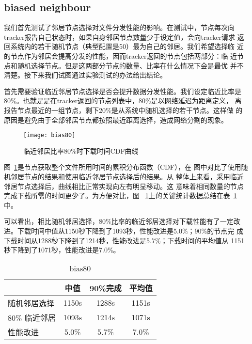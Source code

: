 \subsection{biased neighbour}


我们首先测试了邻居节点选择对文件分发性能的影响。在测试中，节点每次向
tracker报告自己状态时，如果自身邻居节点数量少于设定值，会向tracker请求
返回系统内的若干随机节点（典型配置是50）最为自己的邻居。我们希望选择临
近的节点作为邻居会提高分发的性能，因而tracker返回的节点包括两部分：临
近节点和随机选择节点。但是这两部分节点的数量、比率在什么情况下会是最优
并不清楚。接下来我们试图通过实验测试的办法给出结论。

首先需要验证临近邻居节点选择是否会提升数据分发性能。我们设定临近比率是
80\%。也就是是在tracker返回的节点列表中，80\%是以网络延迟为距离定义，
离报告节点最近的一组节点，剩下20\%是从系统中随机选择的若干节点。这样做
的原因是避免由于全部邻居节点都按照最近距离选择，造成网络分割的现象。

\begin{figure}
  \centering
  \begin{minipage}{0.8\linewidth}
    \centering
    \texttt{[image: bias80]}
    \caption{临近邻居比率80\%时下载时间CDF曲线}
    \label{fig:bias80}
  \end{minipage}
\end{figure}

图~\ref{fig:bias80}是节点获取整个文件所用时间的累积分布函数（CDF），在
图中对比了使用随机邻居节点的结果和使用临近邻居节点选择后的结果。从
整体上来看，采用临近邻居节点选择后，曲线相比正常实现向左有明显移动。这
意味着相同数量的节点完成下载所需的时间更少了。为方便对比，图~
\ref{fig:bias80}上的关键统计数据总结在表~\ref{tbl:bias80}中。

可以看出，相比随机邻居选择，80\%比率的临近邻居选择对下载性能有了一定改
进。下载时间中值从1150秒下降到了1093秒，性能改进是5.0\%；90\%的节点完
成下载时间从1288秒下降到了1214秒，性能改进是5.7\%；下载时间的平均值从
1151秒下降到了1071秒，性能改进是7.0\%。

\begin{table}
\centering
\begin{minipage}{0.8\linewidth}
\centering
\caption{bias80}
\label{tbl:bias80}
\begin{tabular}{lccc}

\toprule[1.5pt]
    & 中值 & 90\%完成 & 平均值\\
\midrule[1pt]
随机邻居选择  & 1150s & 1288s & 1151s\\
80\% 临近邻居 & 1093s & 1214s & 1071s\\
性能改进      & 5.0\% & 5.7\% & 7.0\%\\
\bottomrule[1.5pt]
\end{tabular}
\end{minipage}
\end{table}

